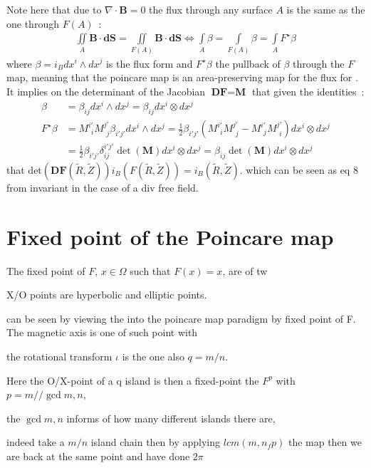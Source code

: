 Note here that due to $\nabla\cdot\textbf{B} = 0$ the flux through any surface $A$ is the same as the one through $F(A)$~:
\begin{align*}
    \iint\limits_{A}\textbf{B}\cdot\textbf{dS} = \iint\limits_{F(A)}\textbf{B}\cdot\textbf{dS} \Leftrightarrow \int\limits_{A}\beta = \int\limits_{F(A)}\beta = \int\limits_{A}F^\star\beta
\end{align*}
where $\beta = i_Bdx^i\wedge dx^j$ is the flux form and $F^\star\beta$ the pullback of $\beta$ through the $F$ map, meaning that the poincare map is an area-preserving map for the flux for \cite{meiss_thirty_2015}. It implies on the determinant of the Jacobian $\textbf{DF} = \textbf{M}$ that given the identities~:
\begin{align*}
    \beta &= \beta_{ij}dx^i\wedge dx^j = \beta_{ij}dx^i\otimes dx^j\\
    F^\star\beta &= M^{i'}_{\,\:i}M^{j'}_{\,\:j}\beta_{i'j'}dx^i\wedge dx^j = \frac{1}{2}\beta_{i'j'}\left(M^{i'}_{\,\:i}M^{j'}_{\,\:j}-M^{i'}_{\,\:j}M^{j'}_{\,\:i}\right)dx^i\otimes dx^j\\ &= \frac{1}{2}\beta_{i'j'}\delta^{i'j'}_{ij} \det(\textbf{M})dx^i\otimes dx^j = \beta_{ij}\det(\textbf{M})dx^i\otimes dx^j
\end{align*}
that $\text{det}(\textbf{DF}(\tilde{R},\tilde{Z}))i_B(F(\tilde{R},\tilde{Z})) = i_B(\tilde{R},\tilde{Z})$. which can be seen as eq 8 from invariant in the case of a div free field. 

\section{Fixed point of the Poincare map}
The fixed point of $F$, $x\in\Omega$ such that $F(x) = x$, are of tw

X/O points are hyperbolic and elliptic points.

can be seen by viewing the into the poincare map paradigm by fixed point of F. The magnetic axis is one of such point with 

the rotational transform $\iota$ is the one also $q=m/n$.

Here the O/X-point of a q island is then a fixed-point the $F^p$ with $p = m//\gcd{m,n}$, 

the $\gcd{m,n}$ informs of how many different islands there are,

indeed take a $m/n$ island chain then by applying $lcm(m, n_fp)$ the map then we are back at the same point and have done $2\pi$


